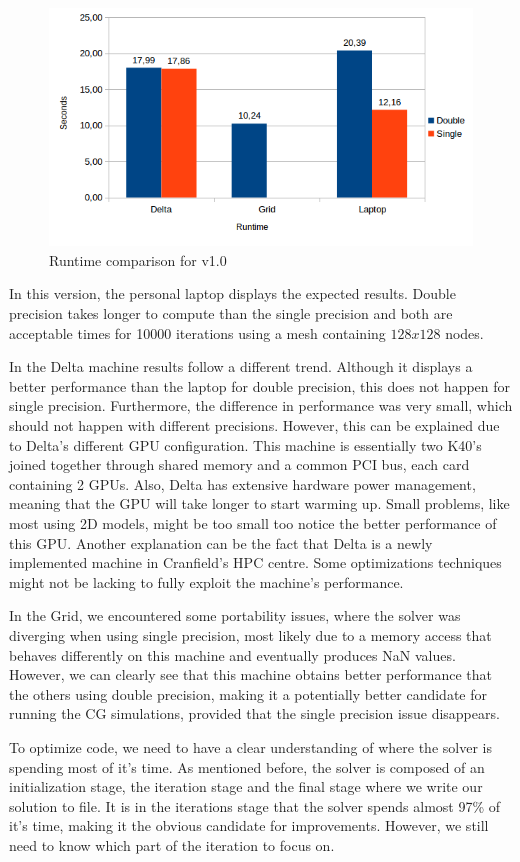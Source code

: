 \documentclass[12pt, openany]{book}
\begin{document}
  \begin{figure}[H]
  	\centering
  	\includegraphics[width=\linewidth]{Resources/Images/v1.png}
  	\caption{Runtime comparison for v1.0}
  	\label{fig:v1}
  \end{figure}
  
  In this version, the personal laptop displays the expected results. Double precision takes longer to compute than the single precision and both are acceptable times for 10000 iterations using a mesh containing $128x128$ nodes. \par
  In the Delta machine results follow a different trend. Although it displays a better performance than the laptop for double precision, this does not happen for single precision. Furthermore, the difference in performance was very small, which should not happen with different precisions. However, this can be explained due to Delta's different GPU configuration. This machine is essentially two K40's joined together through shared memory and a common PCI bus, each card containing 2 GPUs. Also, Delta has extensive hardware power management, meaning that the GPU will take longer to start warming up. Small problems, like most using 2D models, might be too small too notice the better performance of this GPU. Another explanation can be the fact that Delta is a newly implemented machine in Cranfield's HPC centre. Some optimizations techniques might not be lacking to fully exploit the machine's performance.\par
  In the Grid, we encountered some portability issues, where the solver was diverging when using single precision, most likely due to a memory access that behaves differently on this machine and eventually produces NaN values. However, we can clearly see that this machine obtains better performance that the others using double precision, making it a potentially better candidate for running the CG simulations, provided that the single precision issue disappears.\par
  To optimize code, we need to have a clear understanding of where the solver is spending most of it's time. As mentioned before, the solver is composed of an initialization stage, the iteration stage and the final stage where we write our solution to file. It is in the iterations stage that the solver spends almost 97\% of it's time, making it the obvious candidate for improvements. However, we still need to know which part of the iteration to focus on. 
  
\end{document}
